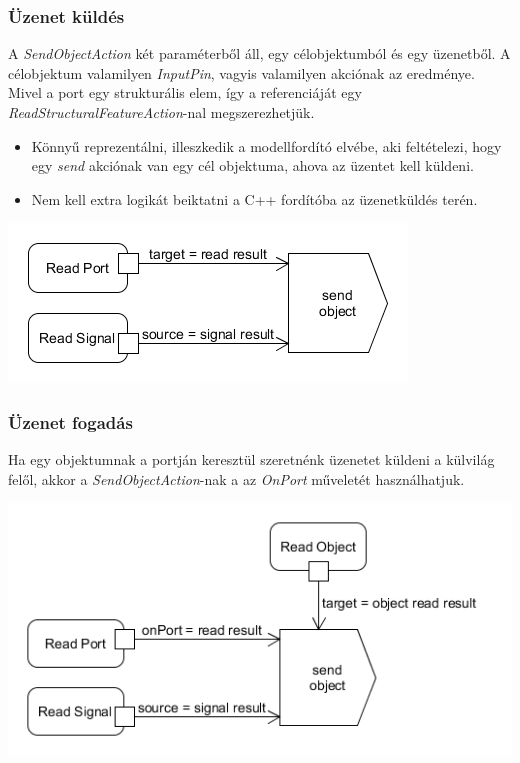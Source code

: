 \documentclass[a4paper,12pt]{report}
\begin{document}
\subsubsection{Üzenet küldés}
A  \textit{SendObjectAction} két paraméterből áll, egy célobjektumból és egy üzenetből.
A célobjektum valamilyen \textit{InputPin}, vagyis valamilyen akciónak az eredménye.
Mivel a port egy strukturális elem, így a referenciáját egy \textit{ReadStructuralFeatureAction}-nal megszerezhetjük. 
\begin{itemize}
\item Könnyű reprezentálni, illeszkedik a modellfordító elvébe, aki feltételezi, hogy
egy \textit{send} akciónak van egy cél objektuma, ahova az üzentet kell küldeni.
\item Nem kell extra logikát beiktatni a C++ fordítóba az üzenetküldés terén.
\end{itemize}

\includegraphics[scale=0.8]{send_uml.png}

\subsubsection{Üzenet fogadás}
Ha egy objektumnak a portján keresztül szeretnénk üzenetet küldeni a külvilág felől, akkor a \textit{SendObjectAction}-nak a az \textit{OnPort} műveletét használhatjuk. 

\includegraphics[scale=0.6]{receive_uml.png}
\end{document}
